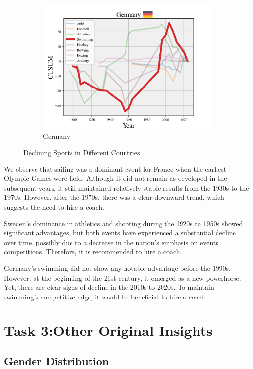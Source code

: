 \documentclass[12pt]{article}  %
\begin{document}
\begin{figure}[H]
\begin{subfigure}[b]{.32\textwidth}
		\includegraphics[width=\textwidth]{img/Decline3.png}
		\caption{Germany}\label{subfig:3}
	\end{subfigure}
	\caption{Declining Sports in Different Countries}\label{fig:subfigures}
\end{figure}

We observe that sailing was a dominant event for France when the earliest Olympic Games were held. Although it did not remain as developed in the subsequent years, it still maintained relatively stable results from the 1930s to the 1970s. However, after the 1970s, there was a clear downward trend, which suggests the need to hire a coach.

Sweden's dominance in athletics and shooting during the 1920s to 1950s showed significant advantages, but both events have experienced a substantial decline over time, possibly due to a decrease in the nation's emphasis on events competitions. Therefore, it is recommended to hire a coach.

Germany’s swimming did not show any notable advantage before the 1990s. However, at the beginning of the 21st century, it emerged as a new powerhorse. Yet, there are clear signs of decline in the 2010s to 2020s. To maintain swimming’s competitive edge, it would be beneficial to hire a coach.



\section{Task 3:Other Original Insights}

\subsection{Gender Distribution}
\end{document}
